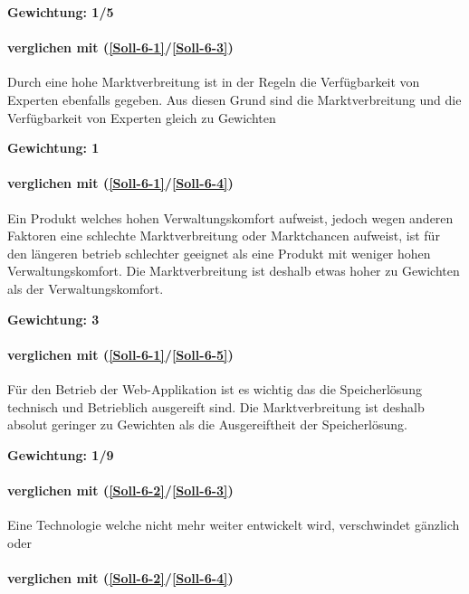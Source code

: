 \textbf{Gewichtung: 1/5}


\paragraph*{ verglichen mit  (\ref{Soll-6-1}/\ref{Soll-6-3})}
Durch eine hohe Marktverbreitung ist in der Regeln die Verfügbarkeit von Experten ebenfalls gegeben. Aus diesen Grund sind die Marktverbreitung und die Verfügbarkeit von Experten gleich zu Gewichten

\textbf{Gewichtung: 1}

\paragraph*{ verglichen mit  (\ref{Soll-6-1}/\ref{Soll-6-4})}
Ein Produkt welches hohen Verwaltungskomfort aufweist, jedoch wegen anderen Faktoren eine schlechte Marktverbreitung oder Marktchancen aufweist, ist für den längeren betrieb schlechter geeignet als eine Produkt mit weniger hohen Verwaltungskomfort. Die Marktverbreitung ist deshalb etwas hoher zu Gewichten als der Verwaltungskomfort.

\textbf{Gewichtung: 3}

\paragraph*{ verglichen mit  (\ref{Soll-6-1}/\ref{Soll-6-5})}
Für den Betrieb der Web-Applikation ist es wichtig das die Speicherlösung technisch und Betrieblich ausgereift sind. Die Marktverbreitung ist deshalb absolut geringer zu Gewichten als die Ausgereiftheit der Speicherlösung.

\textbf{Gewichtung: 1/9}

\paragraph*{ verglichen mit  (\ref{Soll-6-2}/\ref{Soll-6-3})}
Eine Technologie welche nicht mehr weiter entwickelt wird, verschwindet gänzlich oder 

\paragraph*{ verglichen mit  (\ref{Soll-6-2}/\ref{Soll-6-4})}

